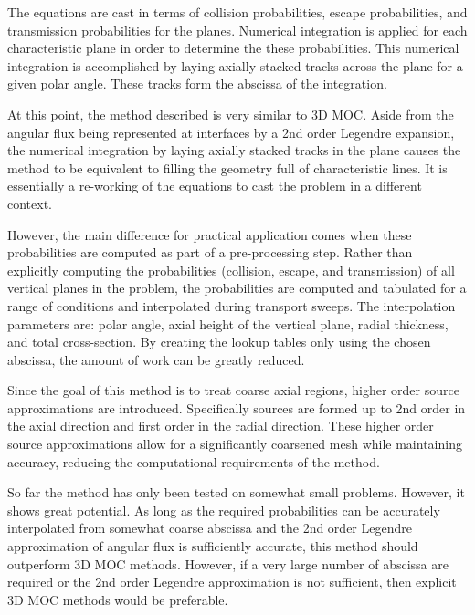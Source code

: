 The equations are cast in terms of collision probabilities, escape probabilities, and transmission probabilities for the planes. Numerical integration is applied for each characteristic plane in order to determine the these probabilities. This numerical integration is accomplished by laying axially stacked tracks across the plane for a given polar angle. These tracks form the abscissa of the integration. 

At this point, the method described is very similar to 3D \ac{MOC}. Aside from the angular flux being represented at interfaces by a 2nd order Legendre expansion, the numerical integration by laying axially stacked tracks in the plane causes the method to be equivalent to filling the geometry full of characteristic lines. It is essentially a re-working of the equations to cast the problem in a different context.

However, the main difference for practical application comes when these probabilities are computed as part of a pre-processing step. Rather than explicitly computing the probabilities (collision, escape, and transmission) of all vertical planes in the problem, the probabilities are computed and tabulated for a range of conditions and interpolated during transport sweeps. The interpolation parameters are: polar angle, axial height of the vertical plane, radial thickness, and total cross-section. By creating the lookup tables only using the chosen abscissa, the amount of work can be greatly reduced.

Since the goal of this method is to treat coarse axial regions, higher order source approximations are introduced. Specifically sources are formed up to 2nd order in the axial direction and first order in the radial direction. These higher order source approximations allow for a significantly coarsened mesh while maintaining accuracy, reducing the computational requirements of the method.

So far the method has only been tested on somewhat small problems. However, it shows great potential. As long as the required probabilities can be accurately interpolated from somewhat coarse abscissa and the 2nd order Legendre approximation of angular flux is sufficiently accurate, this method should outperform 3D \ac{MOC} methods. However, if a very large number of abscissa are required or the 2nd order Legendre approximation is not sufficient, then explicit 3D \ac{MOC} methods would be preferable. 


